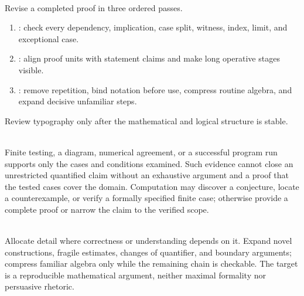 \begin{process} \label{proc:proof-revision-passes} \\
Revise a completed proof in three ordered passes.
\begin{enumerate}[label=(\roman*)]
\setlength{\itemsep}{0pt}
\item {}: check every dependency, implication, case split, witness, index, limit, and exceptional case.
\item {}: align proof units with statement claims and make long operative stages visible.
\item {}: remove repetition, bind notation before use, compress routine algebra, and expand decisive unfamiliar steps.
\end{enumerate}
Review typography only after the mathematical and logical structure is stable.
\end{process}

\begin{warning} \label{warn:evidence-is-not-proof} \\
Finite testing, a diagram, numerical agreement, or a successful program run supports only the cases and conditions examined. Such evidence cannot close an unrestricted quantified claim without an exhaustive argument and a proof that the tested cases cover the domain. Computation may discover a conjecture, locate a counterexample, or verify a formally specified finite case; otherwise provide a complete proof or narrow the claim to the verified scope.
\end{warning}

\begin{principle} \label{princ:proof-detail-proportionality} \\
Allocate detail where correctness or understanding depends on it. Expand novel constructions, fragile estimates, changes of quantifier, and boundary arguments; compress familiar algebra only while the remaining chain is checkable. The target is a reproducible mathematical argument, neither maximal formality nor persuasive rhetoric.
\end{principle}
